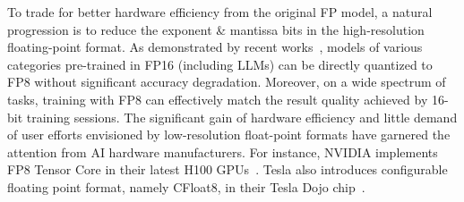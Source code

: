 \begin{table}[htbp!]
\centering
{}
\caption{Comparison of Floating Point, Uniform Quantization, and Non-Uniform Quantization}
\label{tab:data_format_comparison}
\end{table}

To trade for better hardware efficiency from the original FP model, a natural progression is to reduce the exponent \& mantissa bits in the high-resolution floating-point format.
As demonstrated by recent works~\citep{micikevicius2022fp8, sun2019hybrid}, models of various categories pre-trained in FP16 (including LLMs) can be directly quantized to FP8 without significant accuracy degradation. Moreover, on a wide spectrum of tasks, training with FP8 can effectively match the result quality achieved by 16-bit training sessions.
The significant gain of hardware efficiency and little demand of user efforts envisioned by low-resolution float-point formats have garnered the attention from AI hardware manufacturers.
For instance, NVIDIA implements FP8 Tensor Core in their latest H100 GPUs~\citep{nvidiahopperarchitecture}.
Tesla also introduces configurable floating point format, namely CFloat8, in their Tesla Dojo chip~\citep{tesladojotechnology}.

